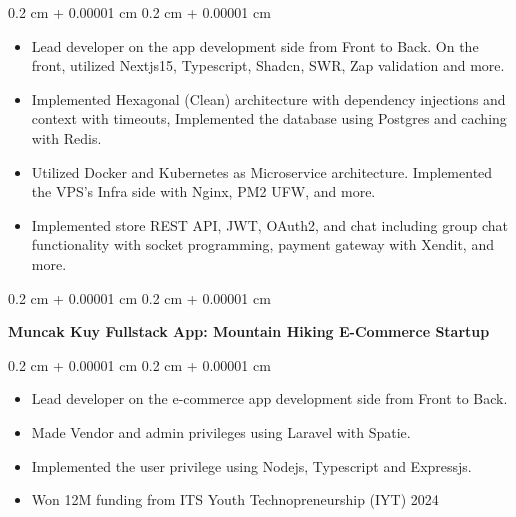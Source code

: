 \documentclass[10pt, letterpaper]{article}
\newenvironment{highlights}{
    \begin{itemize}[
        topsep=0.10 cm,
        parsep=0.10 cm,
        partopsep=0pt,
        itemsep=0pt,
        leftmargin=0.4 cm + 10pt
    ]
}{
    \end{itemize}
} %
\newenvironment{onecolentry}{
    \begin{adjustwidth}{
        0.2 cm + 0.00001 cm
    }{
        0.2 cm + 0.00001 cm
    }
}{
    \end{adjustwidth}
} %
\newenvironment{twocolentry}[2][]{
    \onecolentry
    \def\secondColumn{#2}
    \setcolumnwidth{\fill, 4.5 cm}
    \begin{paracol}{2}
}{
    \switchcolumn \raggedleft \secondColumn
    \end{paracol}
    \endonecolentry
} %
\let\hrefWithoutArrow\href
\renewcommand{\href}[2]{\hrefWithoutArrow{#1}{\ifthenelse{\equal{#2}{}}{ }{#2 }\raisebox{.15ex}{\footnotesize \faExternalLink*}}}
\begin{document}
        \vspace{0.10 cm}
        \begin{onecolentry}
            \begin{highlights}
                \item Lead developer on the app development side from Front to Back. On the front, utilized Nextjs15, Typescript, Shadcn, SWR, Zap validation and more.
                \item Implemented Hexagonal (Clean) architecture with dependency injections and context with timeouts, Implemented the database using Postgres and caching with Redis.
                \item Utilized Docker and Kubernetes as Microservice architecture. Implemented the VPS's Infra side with Nginx, PM2 UFW, and more.
                \item Implemented store REST API, JWT, OAuth2, and chat including group chat functionality with socket programming, payment gateway with Xendit, and more.
            \end{highlights}
        \end{onecolentry}

        \vspace{0.2 cm}

        \begin{twocolentry}{

        \textit{\href{https://yehezkiel-wiradhika.vercel.app/projects/real-world-projects/muncak-kuy}{View project}}}
            \textbf{Muncak Kuy Fullstack App: Mountain Hiking E-Commerce Startup}
        \end{twocolentry}

        \vspace{0.10 cm}
        \begin{onecolentry}
            \begin{highlights}
                \item Lead developer on the e-commerce app development side from Front to Back.
                \item Made Vendor and admin privileges using Laravel with Spatie.
                \item Implemented the user privilege using Nodejs, Typescript and Expressjs.
                \item Won 12M funding from ITS Youth Technopreneurship (IYT) 2024
            \end{highlights}
        \end{onecolentry}
\end{document}
